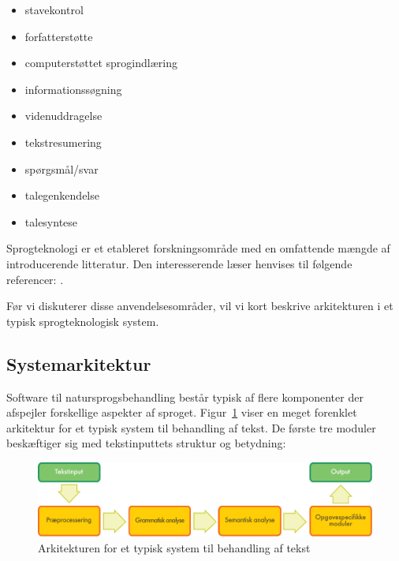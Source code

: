 \begin{multicols}{2}
\begin{itemize}
      \item stavekontrol
      \item forfatterst\o tte
      \item computerst\o ttet sprogindl\ae ring
      \item informationss\o gning
      \item videnuddragelse
      \item tekstresumering
      \item sp\o rgsm\aa l/svar
      \item talegenkendelse
      \item talesyntese
    \end{itemize}
    \sloppy
Sprogteknologi er et etableret forskningsomr\aa de med en omfattende m\ae ngde af introducerende litteratur. Den interesserende l\ae ser henvises til f\o lgende referencer:  \cite{Braasch, jurafsky-martin01, manning-schuetze1, lt-world1, lt-survey1}.   


 F\o r vi diskuterer disse anvendelses\-omr\aa der, vil vi kort beskrive arkitekturen i et typisk sprogteknologisk system.


\subsection{Systemarkitektur}

 Software til natursprogsbehandling best\aa r typisk af flere komponenter der afspejler forskellige aspekter af sproget.  Figur~\ref{fig:textprocessingarch_de} viser en meget forenklet arkitektur for et typisk system til behandling af tekst. De f\o rste tre moduler besk\ae ftiger sig med tekstinputtets struktur og betydning:

\begin{figure}[htb]
  \center
  \includegraphics[width=\textwidth]{../_media/danish/text_processing_app_architecture}
  \caption{Arkitekturen for et typisk system til behandling af tekst}
  \label{fig:textprocessingarch_de}
\end{figure}


\end{multicols}
